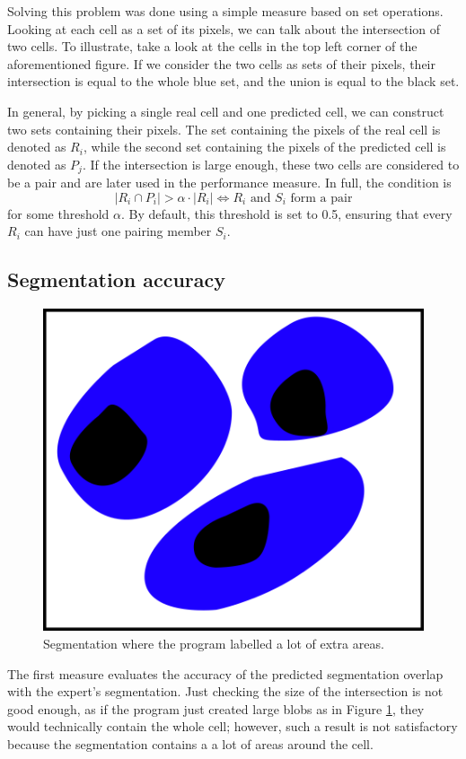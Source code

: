 \documentclass[
  digital,     %
  oneside,     %
  nosansbold,  %
  nocolorbold, %
  lof,         %
  lot,         %
]{fithesis4}
\begin{document}
Solving this problem was done using a simple measure based on set operations.
Looking at each cell as a set of its pixels, we can talk about the intersection
of two cells. To illustrate, take a look at the cells in the top left corner of
the aforementioned figure. If we consider the two cells as sets of their
pixels, their intersection is equal to the whole blue set, and the union is
equal to the black set.

In general, by picking a single real cell and one predicted cell, we can construct
two sets containing their pixels. The set containing the pixels of the real cell is
denoted as $R_i$, while the second set containing the pixels of the predicted
cell is denoted as $P_j$. If the intersection is large enough, these two
cells are considered to be a pair and are later used in the performance measure. In full, the condition is
$$|R_i \cap P_i| > \alpha \cdot |R_i| \Leftrightarrow R_i \text{ and } S_i \text{ form a pair}$$
for some threshold $\alpha$. By default, this threshold is set to 0.5, ensuring
that every $R_i$ can have just one pairing member $S_i$.

\subsection{Segmentation accuracy}
\begin{figure}
    \begin{center}
        \includegraphics{resources/inkscape/evaluation_imprecise_segmentation.png}
    \end{center}
    \caption{Segmentation where the program labelled a lot of extra areas.}
    \label{fig:evaluation_imprecise}
\end{figure}
The first measure evaluates the accuracy of the predicted segmentation overlap
with the expert's segmentation. Just checking the size of the intersection is
not good enough, as if the program just created large blobs as in Figure
\ref{fig:evaluation_imprecise}, they would technically contain the whole cell;
however, such a result is not satisfactory because the segmentation contains a
a lot of areas around the cell.
\end{document}
